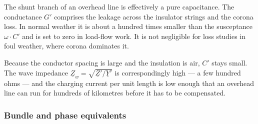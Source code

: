 The shunt branch of an overhead line is effectively a pure capacitance. The
conductance $G'$ comprises the leakage across the insulator strings and the
corona loss. In normal weather it is about a hundred times smaller than the
susceptance $\omega \cdot C'$ and is set to zero in load-flow work. It is
not negligible for loss studies in foul weather, where corona dominates
it.

Because the conductor spacing is large and the insulation is air, $C'$
stays small. The wave impedance $\underline{Z}_w = \sqrt{\underline{Z}' /
\underline{Y}'}$ is correspondingly high --- a few hundred ohms --- and the
charging current per unit length is low enough that an overhead line can run
for hundreds of kilometres before it has to be compensated.

\subsubsection{Bundle and phase equivalents}
\label{sec:ohl-bundle}

